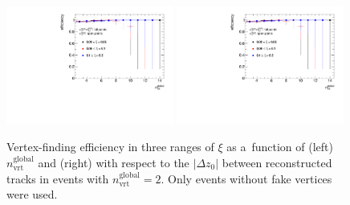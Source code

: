 \begin{figure}[h!]
	\centering
	\includegraphics[width=0.49\textwidth,page=1]{chapters/chrgSTAR/img/vertex/vertexEffi_ksi_noFake.pdf}
	\includegraphics[width=0.49\textwidth,page=8]{chapters/chrgSTAR/img/vertex/vertexEffi_ksi_noFake.pdf}
	\caption{Vertex-finding efficiency in three ranges of $\xi$ as a~function of  (left) $n^\textrm{global}_\textrm{vrt}$ and (right) with respect to the $|\Delta z_0|$ between reconstructed tracks in events with $n^\textrm{global}_\textrm{vrt}=2$.  Only events without fake vertices were used. }
	\label{fig:vertexEffi_noFake}
\end{figure}

